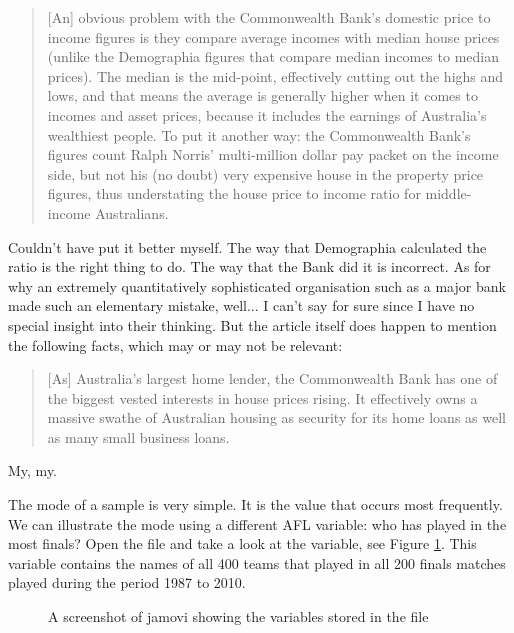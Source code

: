 \small
\begin{quote}
[An] obvious problem with the Commonwealth Bank's domestic price to income figures is they compare average incomes with median house prices (unlike the Demographia figures that compare median incomes to median prices). The median is the mid-point, effectively cutting out the highs and lows, and that means the average is generally higher when it comes to incomes and asset prices, because it includes the earnings of Australia's wealthiest people. To put it another way: the Commonwealth Bank's figures count Ralph Norris' multi-million dollar pay packet on the income side, but not his (no doubt) very expensive house in the property price figures, thus understating the house price to income ratio for middle-income Australians.
\end{quote}
\normalsize
Couldn't have put it better myself. The way that Demographia calculated the ratio is the right thing to do. The way that the Bank did it is incorrect. As for why an extremely quantitatively sophisticated organisation such as a major bank made such an elementary mistake, well... I can't say for sure since I have no special insight into their thinking. But the article itself does happen to mention the following facts, which may or may not be relevant:
\small
\begin{quote}
[As] Australia's largest home lender, the Commonwealth Bank has one of the biggest vested interests in house prices rising. It effectively owns a massive swathe of Australian housing as security for its home loans as well as many small business loans.
\end{quote}
\normalsize
My, my. 


The mode of a sample is very simple. It is the value that occurs most frequently. We can illustrate the mode using a different AFL variable: who has played in the most finals? Open the  file and take a look at the  variable, see Figure \ref{fig:aflsmall_finalists}. This variable contains the names of all 400 teams that played in all 200 finals matches played during the period 1987 to 2010. 

\begin{figure}[!!htp]
\begin{center}
\caption{A screenshot of jamovi showing the variables stored in the  file}
\label{fig:aflsmall_finalists}
\HR
\end{center}
\end{figure}

